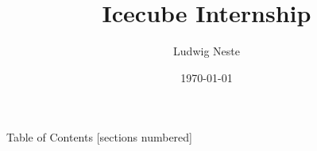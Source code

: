 \documentclass[aspectratio=169]{beamer}
\title{Icecube Internship}
\date{\today}
\author{Ludwig Neste}
\institute{\colorbox{mDarkTeal}{\texttt{[image: media/su\_logo.pdf]}}}
\begin{document}
\begin{frame}
  \titlepage
\end{frame}

\begin{frame}{Table of Contents}
  [sections numbered]
  \tableofcontents[hideallsubsections]
\end{frame}






\begin{frame}
  \nocite{*}
  \printbibliography
\end{frame}
\end{document}
